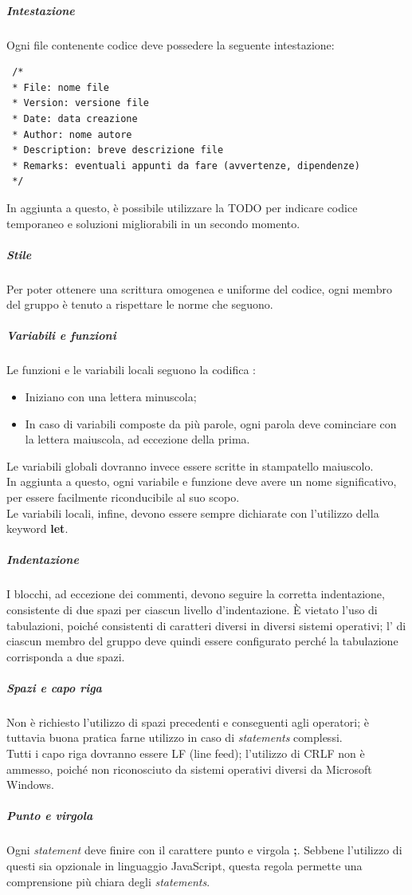 \documentclass[../norme-di-progetto.tex]{subfiles}
\begin{document}
\subparagraph{Intestazione}
Ogni file contenente codice deve possedere la seguente intestazione:
\begin{lstlisting}
 /*
 * File: nome file
 * Version: versione file
 * Date: data creazione
 * Author: nome autore
 * Description: breve descrizione file
 * Remarks: eventuali appunti da fare (avvertenze, dipendenze)
 */
\end{lstlisting}
In aggiunta a questo, è possibile utilizzare la  TODO per indicare codice temporaneo e soluzioni migliorabili in un secondo momento.

\subparagraph{Stile}
Per poter ottenere una scrittura omogenea e uniforme del codice, ogni membro del gruppo è tenuto a rispettare le norme che seguono.

\subparagraph*{Variabili e funzioni}
Le funzioni e le variabili locali seguono la codifica :
\begin{itemize}
  \item Iniziano con una lettera minuscola;
  \item In caso di variabili composte da più parole, ogni parola deve cominciare con la lettera maiuscola, ad eccezione della prima.
\end{itemize}
Le variabili globali dovranno invece essere scritte in stampatello maiuscolo. \\
In aggiunta a questo, ogni variabile e funzione deve avere un nome significativo, per essere facilmente riconducibile al suo scopo. \\
Le variabili locali, infine, devono essere sempre dichiarate con l'utilizzo della keyword \textbf{let}.

\subparagraph*{Indentazione}
I blocchi, ad eccezione dei commenti, devono seguire la corretta indentazione, consistente di due spazi per ciascun livello d'indentazione. È vietato l'uso di tabulazioni, poiché consistenti di caratteri diversi in diversi sistemi operativi; l' di ciascun membro del gruppo deve quindi essere configurato perché la tabulazione corrisponda a due spazi.

\subparagraph*{Spazi e capo riga}
Non è richiesto l'utilizzo di spazi precedenti e conseguenti agli operatori; è tuttavia buona pratica farne utilizzo in caso di \textit{statements} complessi. \\
Tutti i capo riga dovranno essere LF (line feed); l'utilizzo di CRLF non è ammesso, poiché non riconosciuto da sistemi operativi diversi da Microsoft Windows.

\subparagraph*{Punto e virgola}
Ogni \textit{statement} deve finire con il carattere punto e virgola \textbf{;}. Sebbene l'utilizzo di questi sia opzionale in linguaggio JavaScript, questa regola permette una comprensione più chiara degli \textit{statements}.
\end{document}
